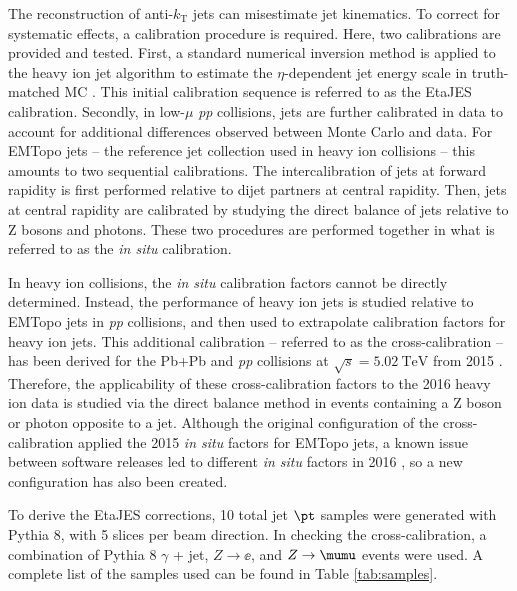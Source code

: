 \documentclass[NOTE, atlasdraft=true, texlive=2016, USenglish]{\ATLASLATEXPATH atlasdoc}
\begin{document}
The reconstruction of anti-$k_{\text{T}}$ jets can misestimate jet kinematics. To correct for systematic effects, a calibration procedure is required. Here, two calibrations are provided and tested. First, a standard numerical inversion method is applied to the heavy ion jet algorithm to estimate the $\eta$-dependent jet energy scale in truth-matched MC \cite{ATL-COM-PHYS-2014-795}. This initial calibration sequence is referred to as the EtaJES calibration. Secondly, in low-$\mu$ \textit{pp} collisions, jets are further calibrated in data to account for additional differences observed between Monte Carlo and data. For EMTopo jets --  the reference jet collection used in heavy ion collisions -- this amounts to two sequential calibrations. The intercalibration of jets at forward rapidity is first performed relative to dijet partners at central rapidity. Then, jets at central rapidity are calibrated by studying the direct balance of jets relative to Z bosons and photons. These two procedures are performed together in what is referred to as the \textit{in situ} calibration.\par

In heavy ion collisions, the \textit{in situ} calibration factors cannot be directly determined. Instead, the performance of heavy ion jets is studied relative to EMTopo jets in \textit{pp} collisions, and then used to extrapolate calibration factors for heavy ion jets. This additional calibration -- referred to as the cross-calibration \cite{ATLAS-CONF-2015-017} -- has been derived for the Pb+Pb and \textit{pp} collisions at $\sqrt{s}=\SI{5.02}{\TeV}$ from 2015 \cite{ATL-COM-PHYS-2016-1253}. Therefore, the applicability of these cross-calibration factors to the 2016 heavy ion data is studied via the direct balance method in events containing a Z boson or photon opposite to a jet. Although the original configuration of the cross-calibration applied the 2015 \textit{in situ} factors for EMTopo jets, a known issue between software releases led to different \textit{in situ} factors in 2016 \cite{ATLAS-CONF-2015-017}, so a new configuration has also been created.\par

To derive the EtaJES corrections, 10 total jet $\pt$ samples were generated with Pythia 8, with 5 slices per beam direction. In checking the cross-calibration, a combination of Pythia 8 $\gamma$ + jet, $Z\rightarrow\ee$, and $Z\rightarrow\mumu$ events were used. A complete list of the samples used can be found in Table \ref{tab:samples}.
\end{document}
